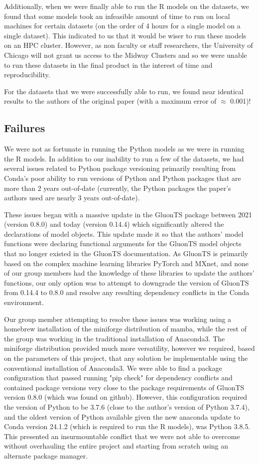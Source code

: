 Additionally, when we were finally able to run the R models on the datasets, we found that some models took an infeasible amount of time to run on local machines for certain datasets (on the order of 4 hours for a single model on a single dataset). This indicated to us that it would be wiser to run these models on an HPC cluster. However, as non faculty or staff researchers, the University of Chicago will not grant us access to the Midway Clusters and so we were unable to run these datasets in the final product in the interest of time and reproducibility. 

For the datasets that we were successfully able to run, we found near identical results to the authors of the original paper (with a maximum error of $\approx$ 0.001)!

\subsection{Failures}
We were not as fortunate in running the Python models as we were in running the R models. In addition to our inability to run a few of the datasets, we had several issues related to Python package versioning primarily resulting from Conda's poor ability to run versions of Python and Python packages that are more than 2 years out-of-date (currently, the Python packages the paper's authors used are nearly 3 years out-of-date).

These issues began with a massive update in the GluonTS package between 2021 (version 0.8.0) and today (version 0.14.4) which significantly altered the declarations of model objects. This update made it so that the authors' model functions were declaring functional arguments for the GluonTS model objects that no longer existed in the GluonTS documentation. As GluonTS is primarily based on the complex machine learning libraries PyTorch and MXnet, and none of our group members had the knowledge of these libraries to update the authors' functions, our only option was to attempt to downgrade the version of GluonTS from 0.14.4 to 0.8.0 and resolve any resulting dependency conflicts in the Conda environment. 

Our group member attempting to resolve these issues was working using a homebrew installation of the miniforge distribution of mamba, while the rest of the group was working in the traditional installation of Anaconda3. The miniforge distribution provided much more versatility, however we required, based on the parameters of this project, that any solution be implementable using the conventional installation of Anaconda3. We were able to find a package configuration that passed running "pip check" for dependency conflicts and contained package versions very close to the package requirements of GluonTS version 0.8.0 (which was found on github). However, this configuration required the version of Python to be 3.7.6 (close to the author's version of Python 3.7.4), and the oldest version of Python available given the new anaconda update to Conda version 24.1.2 (which is required to run the R models), was Python 3.8.5. This presented an insurmountable conflict that we were not able to overcome without overhauling the entire project and starting from scratch using an alternate package manager.


